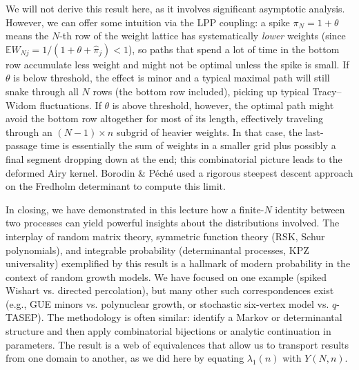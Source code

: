 \documentclass[letterpaper,11pt,oneside,reqno]{article}
\numberwithin{equation}{section}
\theoremstyle{definition}
\begin{document}
We will not derive this result here, as it involves significant asymptotic analysis. However, we can offer some intuition via the LPP coupling: a spike $\pi_N = 1+\theta$ means the $N$-th row of the weight lattice has systematically \emph{lower} weights (since $\mathbb{E}W_{Nj} = 1/(1+\theta + \hat\pi_j) < 1$), so paths that spend a lot of time in the bottom row accumulate less weight and might not be optimal unless the spike is small. If $\theta$ is below threshold, the effect is minor and a typical maximal path will still snake through all $N$ rows (the bottom row included), picking up typical Tracy--Widom fluctuations. If $\theta$ is above threshold, however, the optimal path might avoid the bottom row altogether for most of its length, effectively traveling through an $(N-1)\times n$ subgrid of heavier weights. In that case, the last-passage time is essentially the sum of weights in a smaller grid plus possibly a final segment dropping down at the end; this combinatorial picture leads to the deformed Airy kernel. Borodin \& P\'ech\'e used a rigorous steepest descent approach on the Fredholm determinant to compute this limit.

In closing, we have demonstrated in this lecture how a finite-$N$ identity between two processes can yield powerful insights about the distributions involved. The interplay of random matrix theory, symmetric function theory (RSK, Schur polynomials), and integrable probability (determinantal processes, KPZ universality) exemplified by this result is a hallmark of modern probability in the context of random growth models. We have focused on one example (spiked Wishart vs. directed percolation), but many other such correspondences exist (e.g., GUE minors vs. polynuclear growth, or stochastic six-vertex model vs. $q$-TASEP). The methodology is often similar: identify a Markov or determinantal structure and then apply combinatorial bijections or analytic continuation in parameters. The result is a web of equivalences that allow us to transport results from one domain to another, as we did here by equating $\lambda_1(n)$ with $Y(N,n)$.
\end{document}

